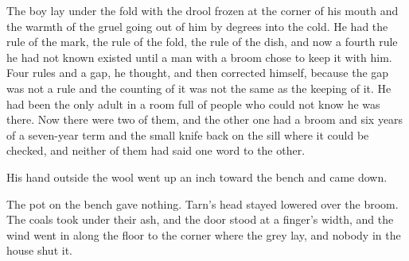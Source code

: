 The boy lay under the fold with the drool frozen at the corner of his mouth and the warmth of the gruel going out of him by degrees into the cold. He had the rule of the mark, the rule of the fold, the rule of the dish, and now a fourth rule he had not known existed until a man with a broom chose to keep it with him. Four rules and a gap, he thought, and then corrected himself, because the gap was not a rule and the counting of it was not the same as the keeping of it. He had been the only adult in a room full of people who could not know he was there. Now there were two of them, and the other one had a broom and six years of a seven-year term and the small knife back on the sill where it could be checked, and neither of them had said one word to the other.

His hand outside the wool went up an inch toward the bench and came down.

The pot on the bench gave nothing. Tarn's head stayed lowered over the broom. The coals took under their ash, and the door stood at a finger's width, and the wind went in along the floor to the corner where the grey lay, and nobody in the house shut it.

